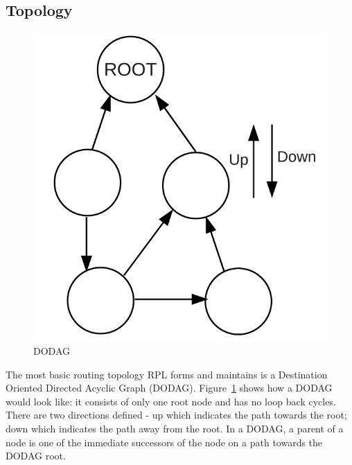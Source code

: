 \subsection{Topology}
\label{RPL:Topology}

\begin{figure}[htbp]
  \begin{center}
    \leavevmode
      \includegraphics[scale=0.4]{Pics/DODAG.pdf}
    \caption{DODAG}
    \label{fig:DODAG}
  \end{center}
\end{figure}
The most basic routing topology RPL forms and maintains is a Destination Oriented Directed Acyclic Graph (DODAG)\@. Figure~\ref{fig:DODAG} shows how a DODAG would look like: it consists of only one root node and has no loop back cycles. There are two directions defined - up which indicates the path towards the root; down which indicates the path away from the root. In a DODAG, a parent of a node is one of the immediate successors of the node on a path towards the DODAG root. 
\newline

